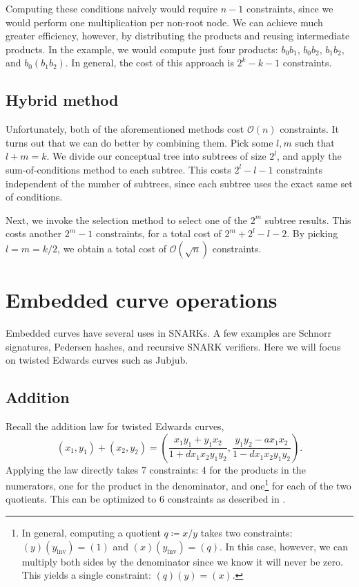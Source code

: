 \documentclass{article}
\begin{document}
Computing these conditions naively would require $n - 1$ constraints, since we would perform one multiplication per non-root node. We can achieve much greater efficiency, however, by distributing the products and reusing intermediate products. In the example, we would compute just four products: $b_0 b_1$, $b_0 b_2$, $b_1 b_2$, and $b_0 (b_1 b_2)$. In general, the cost of this approach is $2^k - k - 1$ constraints.


\subsection{Hybrid method} \label{sec:random-access-hybrid}

Unfortunately, both of the aforementioned methods cost $\mathcal{O}(n)$ constraints. It turns out that we can do better by combining them. Pick some $l, m$ such that $l + m = k$. We divide our conceptual tree into subtrees of size $2^l$, and apply the sum-of-conditions method to each subtree. This costs $2^l - l - 1$ constraints independent of the number of subtrees, since each subtree uses the exact same set of conditions.

Next, we invoke the selection method to select one of the $2^m$ subtree results. This costs another $2^m - 1$ constraints, for a total cost of $2^m + 2^l - l - 2$. By picking $l = m = k/2$, we obtain a total cost of $\mathcal{O}(\sqrt{n})$ constraints.


\section{Embedded curve operations}

Embedded curves have several uses in SNARKs. A few examples are Schnorr signatures, Pedersen hashes, and recursive SNARK verifiers.
Here we will focus on twisted Edwards curves such as Jubjub.


\subsection{Addition}

Recall the addition law for twisted Edwards curves,
\begin{equation}
  (x_1, y_1) + (x_2, y_2) = \left( \frac{x_1 y_1 + y_1 x_2}{1 + d x_1 x_2 y_1 y_2}, \frac{y_1 y_2 - a x_1 x_2}{1 - d x_1 x_2 y_1 y_2} \right).
\end{equation}
Applying the law directly takes 7 constraints: 4 for the products in the numerators, one for the product in the denominator, and one\footnote{In general, computing a quotient $q \coloneqq x / y$ takes two constraints: $(y) (y_\mathrm{inv}) = (1)$ and $(x) (y_\mathrm{inv}) = (q)$. In this case, however, we can multiply both sides by the denominator since we know it will never be zero. This yields a single constraint: $(q) (y) = (x)$.} for each of the two quotients. This can be optimized to 6 constraints as described in \cite{hopwood2016zcash}.
\end{document}
